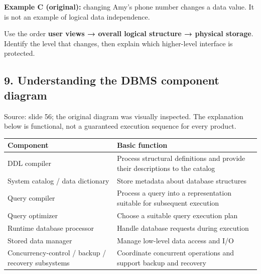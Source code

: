 \textbf{Example C (original):} changing Amy's phone number changes a data value. It is not an example of logical data independence.

Use the order \textbf{user views → overall logical structure → physical storage}. Identify the level that changes, then explain which higher-level interface is protected.

\Needspace{11cm}
\subsection{9. Understanding the DBMS component diagram}\label{01_database_fundamentals_en-understanding-the-dbms-component-diagram}


Source: slide 56; the original diagram was visually inspected. The explanation below is functional, not a guaranteed execution sequence for every product.

\begin{longtable}[]{@{}
  >{\raggedright\arraybackslash}p{}
  >{\raggedright\arraybackslash}p{}@{}}
\toprule\noalign{}
\begin{minipage}[b]{\linewidth}\raggedright
Component
\end{minipage} & \begin{minipage}[b]{\linewidth}\raggedright
Basic function
\end{minipage} \\
\midrule\noalign{}
\endhead
\bottomrule\noalign{}
\endlastfoot
DDL compiler & Process structural definitions and provide their descriptions to the catalog \\
System catalog / data dictionary & Store metadata about database structures \\
Query compiler & Process a query into a representation suitable for subsequent execution \\
Query optimizer & Choose a suitable query execution plan \\
Runtime database processor & Handle database requests during execution \\
Stored data manager & Manage low-level data access and I/O \\
Concurrency-control / backup / recovery subsystems & Coordinate concurrent operations and support backup and recovery \\
\end{longtable}

